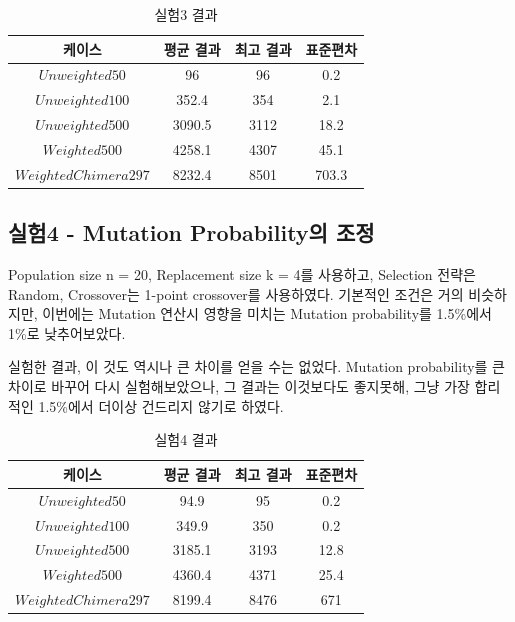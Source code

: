 \documentclass{article}
\begin{document}
 \begin{table}[h]
 \begin{center}
\caption{실험3 결과}
\begin{tabular}{cccc}
\hline\hline
케이스 & 평균 결과 & 최고 결과 & 표준편차\\
\hline\hline
$Unweighted 50$ & 96 & 96 & 0.2\\
\hline
$Unweighted 100$ & 352.4 & 354 & 2.1\\
\hline
$Unweighted 500$ & 3090.5 & 3112 & 18.2\\
\hline
$Weighted 500$ & 4258.1 & 4307 & 45.1\\
\hline
$Weighted Chimera 297$ & 8232.4 & 8501 & 703.3\\
\hline
\end{tabular}
\end{center}
\end{table}

\subsection{실험4 - Mutation Probability의 조정}

Population size n = 20, Replacement size k = 4를 사용하고, Selection 전략은 Random, Crossover는 1-point crossover를 사용하였다. 기본적인 조건은 거의 비슷하지만, 이번에는 Mutation 연산시 영향을 미치는 Mutation probability를 1.5\%에서 1\%로 낮추어보았다.

실험한 결과, 이 것도 역시나 큰 차이를 얻을 수는 없었다. Mutation probability를 큰 차이로 바꾸어 다시 실험해보았으나, 그 결과는 이것보다도 좋지못해, 그냥 가장 합리적인 1.5\%에서 더이상 건드리지 않기로 하였다.\linebreak\linebreak\linebreak


 \begin{table}[h]
 \begin{center}
\caption{실험4 결과}
\begin{tabular}{cccc}
\hline\hline
케이스 & 평균 결과 & 최고 결과 & 표준편차\\
\hline\hline
$Unweighted 50$ & 94.9 & 95 & 0.2\\
\hline
$Unweighted 100$ & 349.9 & 350 & 0.2\\
\hline
$Unweighted 500$ & 3185.1 & 3193 & 12.8\\
\hline
$Weighted 500$ & 4360.4 & 4371 & 25.4\\
\hline
$Weighted Chimera 297$ & 8199.4 & 8476 & 671\\
\hline
\end{tabular}
\end{center}
\end{table}
\end{document}
